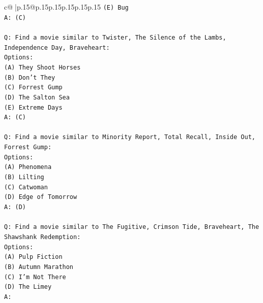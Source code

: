 \documentclass{article}
\begin{document}
{\begin{supertabular}{c@{$\;$}|p{.15\linewidth}@{}p{.15\linewidth}p{.15\linewidth}p{.15\linewidth}p{.15\linewidth}p{.15\linewidth}}
{{{\texttt{(E) Bug} \\
\texttt{A: (C)} \\
\\ 
\texttt{Q: Find a movie similar to Twister, The Silence of the Lambs, Independence Day, Braveheart:} \\
\texttt{Options:} \\
\texttt{(A) They Shoot Horses} \\
\texttt{(B) Don't They} \\
\texttt{(C) Forrest Gump} \\
\texttt{(D) The Salton Sea} \\
\texttt{(E) Extreme Days} \\
\texttt{A: (C)} \\
\\ 
\texttt{Q: Find a movie similar to Minority Report, Total Recall, Inside Out, Forrest Gump:} \\
\texttt{Options:} \\
\texttt{(A) Phenomena} \\
\texttt{(B) Lilting} \\
\texttt{(C) Catwoman} \\
\texttt{(D) Edge of Tomorrow} \\
\texttt{A: (D)} \\
\\ 
\texttt{Q: Find a movie similar to The Fugitive, Crimson Tide, Braveheart, The Shawshank Redemption:} \\
\texttt{Options:} \\
\texttt{(A) Pulp Fiction} \\
\texttt{(B) Autumn Marathon} \\
\texttt{(C) I'm Not There} \\
\texttt{(D) The Limey} \\
\texttt{A:} \\
            }
        }
    }
     \\ \\


\end{supertabular}}
\end{document}
